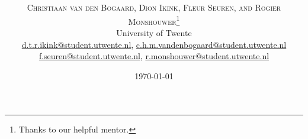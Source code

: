 \documentclass[twoside]{article}
\title{\vspace{-15mm}\fontsize{24pt}{10pt}\selectfont\textbf{\articletitle}} %
\author{
\large
\textsc{Christiaan van den Bogaard, Dion Ikink, Fleur Seuren, and Rogier Monshouwer}\thanks{Thanks to our helpful mentor.}\\[2mm] %
\normalsize University of Twente \\ %
\normalsize \href{mailto:d.t.r.ikink@student.utwente.nl}{d.t.r.ikink@student.utwente.nl}, 
\href{mailto:c.h.m.vandenbogaard@student.utwente.nl}{c.h.m.vandenbogaard@student.utwente.nl} \\
\normalsize\href{mailto:f.seuren@student.utwente.nl}{f.seuren@student.utwente.nl}, %
\href{mailto:r.monshouwer@student.utwente.nl}{r.monshouwer@student.utwente.nl}
}
\date{\today}
\begin{document}
\thispagestyle{empty}
\maketitle %


\begin{abstract}

\noindent \lipsum[1] %

\end{abstract}

\end{document}
